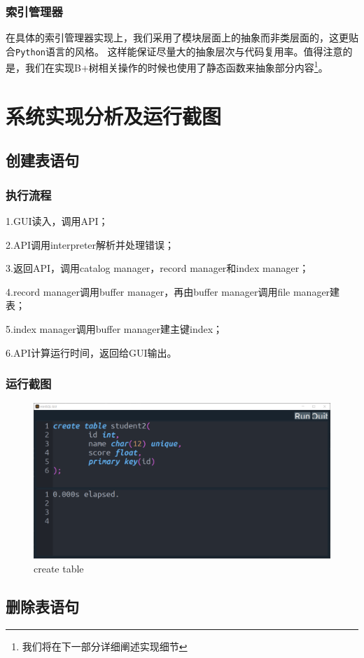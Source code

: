 \documentclass[UTF8]{ctexrep} %
\begin{document}
\subsection{索引管理器}
在具体的索引管理器实现上，我们采用了模块层面上的抽象而非类层面的，这更贴合\texttt{Python}语言的风格。
这样能保证尽量大的抽象层次与代码复用率。值得注意的是，我们在实现B+树相关操作的时候也使用了静态函数来抽象部分内容\footnote{我们将在下一部分详细阐述实现细节}。

\chapter{系统实现分析及运行截图}
\section{创建表语句}
\subsection{执行流程}
1.GUI读入，调用API；
\par
2.API调用interpreter解析并处理错误；
\par
3.返回API，调用catalog manager，record manager和index manager；
\par
4.record manager调用buffer manager，再由buffer manager调用file manager建表；
\par
5.index manager调用buffer manager建主键index；
\par
6.API计算运行时间，返回给GUI输出。
\subsection{运行截图}
\begin{figure}[H]
    \centering
    \includegraphics[width=0.8\linewidth]{figure/1.1.png}
    \caption{create table}
    \label{fig:runtime1.1}
\end{figure}
\section{删除表语句}
\end{document}

